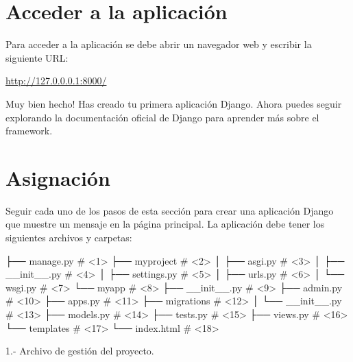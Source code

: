 \documentclass[
  a4paper,
  DIV=11,
  numbers=noendperiod,
  onepage,
  openany]{scrreprt}
\newenvironment{Shaded}{\begin{snugshade}}{\end{snugshade}}
\newcommand{\NormalTok}[1]{\textcolor[rgb]{0.00,0.23,0.31}{#1}}
\begin{document}
\begin{tcolorbox}
\chapter{Acceder a la aplicación}\label{acceder-a-la-aplicaciuxf3n-1}

Para acceder a la aplicación se debe abrir un navegador web y escribir
la siguiente URL:

\href{http://127.0.0.1:8000/}{http://127.0.0.0.1:8000/}

Muy bien hecho! Has creado tu primera aplicación Django. Ahora puedes
seguir explorando la documentación oficial de Django para aprender más
sobre el framework.

\chapter{Asignación}\label{asignaciuxf3n-7}

Seguir cada uno de los pasos de esta sección para crear una aplicación
Django que muestre un mensaje en la página principal. La aplicación debe
tener los siguientes archivos y carpetas:

\label{annotated-cell-193}%
\begin{Shaded}
\begin{Highlighting}[]
\NormalTok{├── manage.py \# \textless{}1\textgreater{}}
\NormalTok{├── myproject \# \textless{}2\textgreater{}}
\NormalTok{│   ├── asgi.py \# \textless{}3\textgreater{}}
\NormalTok{│   ├── \_\_init\_\_.py \# \textless{}4\textgreater{}}
\NormalTok{│   ├── settings.py \# \textless{}5\textgreater{}}
\NormalTok{│   ├── urls.py \# \textless{}6\textgreater{}}
\NormalTok{│   └── wsgi.py \# \textless{}7\textgreater{}}
\NormalTok{└── myapp \# \textless{}8\textgreater{}}
\NormalTok{    ├── \_\_init\_\_.py \# \textless{}9\textgreater{}}
\NormalTok{    ├── admin.py \# \textless{}10\textgreater{}}
\NormalTok{    ├── apps.py \# \textless{}11\textgreater{}}
\NormalTok{    ├── migrations \# \textless{}12\textgreater{}}
\NormalTok{    │   └── \_\_init\_\_.py \# \textless{}13\textgreater{}}
\NormalTok{    ├── models.py \# \textless{}14\textgreater{}}
\NormalTok{    ├── tests.py \# \textless{}15\textgreater{}}
\NormalTok{    ├── views.py \# \textless{}16\textgreater{}}
\NormalTok{    └── templates \# \textless{}17\textgreater{}}
\NormalTok{        └── index.html \# \textless{}18\textgreater{}}
\end{Highlighting}
\end{Shaded}

1.- Archivo de gestión del proyecto.


\end{tcolorbox}
\end{document}
